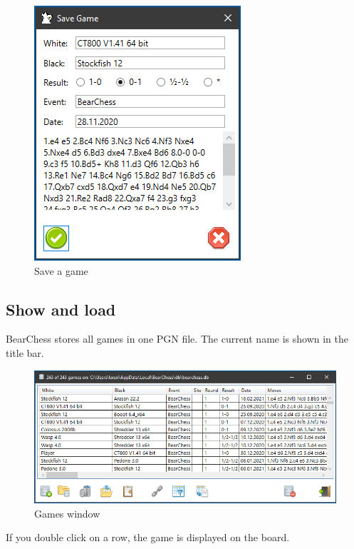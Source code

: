 \documentclass[11pt,a4paper]{article}
\begin{document}
\begin{figure}[H]
	\centering
	\includegraphics[scale=1.0]{Games2.png}
	\caption{Save a game}
	\label{fig:Games2}
\end{figure}


\subsection{Show and load}

BearChess stores all games in one PGN file. The current name is shown in the title bar.

\begin{figure}[H]
	\centering
	\includegraphics[scale=0.6]{Games6.png}
	\caption{Games window}
	\label{fig:Games6}
\end{figure}

If you double click on a row, the game is displayed on the board.
\end{document}
